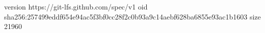 version https://git-lfs.github.com/spec/v1
oid sha256:257499eddf654e94ac5f3bf0cc28f2c0b93a9c14aebf628ba6855e93ac1b1603
size 21960
